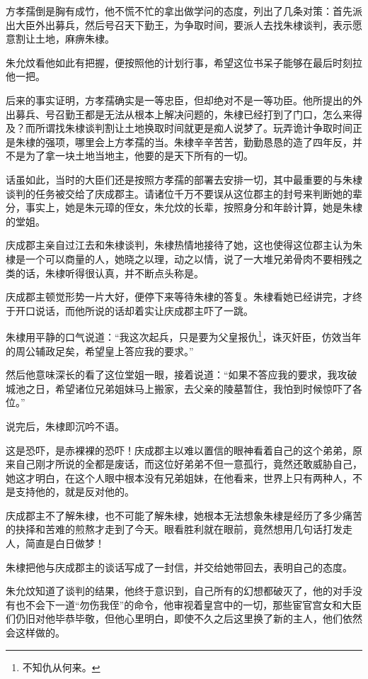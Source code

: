 \begin{multicols}{\theparacolNo}
		方孝孺倒是胸有成竹，他不慌不忙的拿出做学问的态度，列出了几条对策：首先派出大臣外出募兵，然后号召天下勤王，为争取时间，要派人去找朱棣谈判，表示愿意割让土地，麻痹朱棣。

		朱允炆看他如此有把握，便按照他的计划行事，希望这位书呆子能够在最后时刻拉他一把。

		后来的事实证明，方孝孺确实是一等忠臣，但却绝对不是一等功臣。他所提出的外出募兵、号召勤王都是无法从根本上解决问题的，朱棣已经打到了门口，怎么来得及？而所谓找朱棣谈判割让土地换取时间就更是痴人说梦了。玩弄诡计争取时间正是朱棣的强项，哪里会上方孝孺的当。朱棣辛辛苦苦，勤勤恳恳的造了四年反，并不是为了拿一块土地当地主，他要的是天下所有的一切。

		话虽如此，当时的大臣们还是按照方孝孺的部署去安排一切，其中最重要的与朱棣谈判的任务被交给了庆成郡主。请诸位千万不要误从这位郡主的封号来判断她的辈分，事实上，她是朱元璋的侄女，朱允炆的长辈，按照身分和年龄计算，她是朱棣的堂姐。

		庆成郡主亲自过江去和朱棣谈判，朱棣热情地接待了她，这也使得这位郡主认为朱棣是一个可以商量的人，她晓之以理，动之以情，说了一大堆兄弟骨肉不要相残之类的话，朱棣听得很认真，并不断点头称是。

		庆成郡主顿觉形势一片大好，便停下来等待朱棣的答复。朱棣看她已经讲完，才终于开口说话，而他所说的话却着实让庆成郡主吓了一跳。

		朱棣用平静的口气说道：“我这次起兵，只是要为父皇报仇\footnote{不知仇从何来。}，诛灭奸臣，仿效当年的周公辅政足矣，希望皇上答应我的要求。”

		然后他意味深长的看了这位堂姐一眼，接着说道：“如果不答应我的要求，我攻破城池之日，希望诸位兄弟姐妹马上搬家，去父亲的陵墓暂住，我怕到时候惊吓了各位。”

		说完后，朱棣即沉吟不语。

		这是恐吓，是赤裸裸的恐吓！庆成郡主以难以置信的眼神看着自己的这个弟弟，原来自己刚才所说的全都是废话，而这位好弟弟不但一意孤行，竟然还敢威胁自己，她这才明白，在这个人眼中根本没有兄弟姐妹，在他看来，世界上只有两种人，不是支持他的，就是反对他的。

		庆成郡主不了解朱棣，也不可能了解朱棣，她根本无法想象朱棣是经历了多少痛苦的抉择和苦难的煎熬才走到了今天。眼看胜利就在眼前，竟然想用几句话打发走人，简直是白日做梦！

		朱棣把他与庆成郡主的谈话写成了一封信，并交给她带回去，表明自己的态度。

		朱允炆知道了谈判的结果，他终于意识到，自己所有的幻想都破灭了，他的对手没有也不会下一道“勿伤我侄”的命令，他审视着皇宫中的一切，那些宦官宫女和大臣们仍旧对他毕恭毕敬，但他心里明白，即使不久之后这里换了新的主人，他们依然会这样做的。


\end{multicols}
